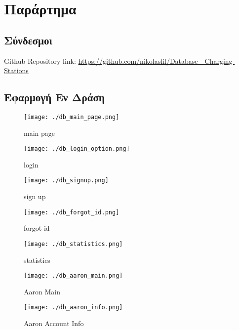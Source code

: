 \documentclass[manuscript,screen,review]{acmart}
\newcommand{\en}[1]{\foreignlanguage{english}{#1}}
\begin{document}
\newpage
\section{Παράρτημα}

\subsection{Σύνδεσμοι}
\en{Github Repository link}: \en{\url{https://github.com/nikolasfil/Database---Charging-Stations}}

\subsection{Eφαρμογή Εν Δράση }

\begin{figure}[H]
    \centering
    \texttt{[image: ./db\_main\_page.png]}
    \caption{\en{main page}}
\end{figure}

\begin{figure}[H]
    \centering
    \texttt{[image: ./db\_login\_option.png]}
    \caption{\en{login}}
\end{figure}

\begin{figure}[H]
    \centering
    \texttt{[image: ./db\_signup.png]}
    \caption{\en{sign up }}
\end{figure}


\begin{figure}[H]
    \centering
    \texttt{[image: ./db\_forgot\_id.png]}
    \caption{\en{forgot id}}
\end{figure}


\begin{figure}[H]
    \centering
    \texttt{[image: ./db\_statistics.png]}
    \caption{\en{statistics}}
\end{figure}

\newpage


\begin{figure}[H]
    \centering
    \texttt{[image: ./db\_aaron\_main.png]}
    \caption{\en{Aaron Main}}
\end{figure}

\begin{figure}[H]
    \centering
    \texttt{[image: ./db\_aaron\_info.png]}
    \caption{\en{Aaron Account Info }}
\end{figure}
\end{document}
